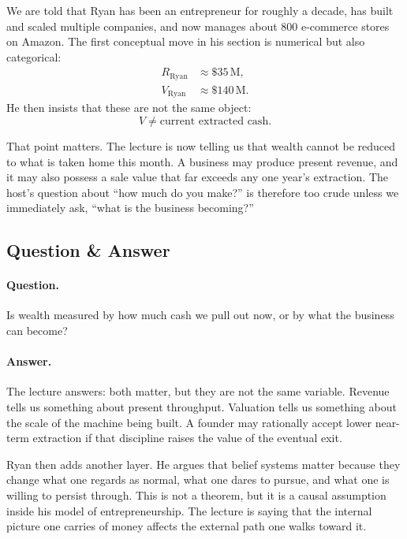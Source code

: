 We are told that Ryan has been an entrepreneur for roughly a decade, has built and scaled multiple companies, and now manages about \(800\) e-commerce stores on Amazon. The first conceptual move in his section is numerical but also categorical:
\begin{align}
R_{\text{Ryan}} &\approx \$35\,\text{M},\\
V_{\text{Ryan}} &\approx \$140\,\text{M}.
\end{align}
He then insists that these are not the same object:
\begin{equation}
V \neq \text{current extracted cash}.
\end{equation}

That point matters. The lecture is now telling us that wealth cannot be reduced to what is taken home this month. A business may produce present revenue, and it may also possess a sale value that far exceeds any one year's extraction. The host's question about ``how much do you make?'' is therefore too crude unless we immediately ask, ``what is the business becoming?''

\subsection{Question \& Answer}

\paragraph{Question.} Is wealth measured by how much cash we pull out now, or by what the business can become?

\paragraph{Answer.} The lecture answers: both matter, but they are not the same variable. Revenue tells us something about present throughput. Valuation tells us something about the scale of the machine being built. A founder may rationally accept lower near-term extraction if that discipline raises the value of the eventual exit.

Ryan then adds another layer. He argues that belief systems matter because they change what one regards as normal, what one dares to pursue, and what one is willing to persist through. This is not a theorem, but it is a causal assumption inside his model of entrepreneurship. The lecture is saying that the internal picture one carries of money affects the external path one walks toward it.

